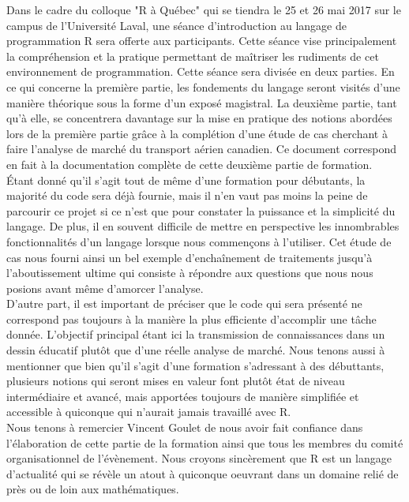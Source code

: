 Dans le cadre du colloque "R à Québec" qui se tiendra le 25 et 26 mai 2017 sur le campus de l'Université Laval, une séance d'introduction au langage de programmation R sera offerte aux participants. Cette séance vise principalement la compréhension et la pratique permettant de maîtriser les rudiments de cet environnement de programmation. \cite{RQC2017} Cette séance sera divisée en deux parties. En ce qui concerne la première partie, les fondements du langage seront visités d'une manière théorique sous la forme d'un exposé magistral. La deuxième partie, tant qu'à elle, se concentrera davantage sur la mise en pratique des notions abordées lors de la première partie grâce à la complétion d'une étude de cas cherchant à faire l'analyse de marché du transport aérien canadien. Ce document correspond en fait à la documentation complète de cette deuxième partie de formation. \\

\noindent
Étant donné qu'il s'agit tout de même d'une formation pour débutants, la majorité du code sera déjà fournie, mais il n'en vaut pas moins la peine de parcourir ce projet si ce n'est que pour constater la puissance et la simplicité du langage. De plus, il en souvent difficile de mettre en perspective les innombrables fonctionnalités d'un langage lorsque nous commençons à l'utiliser. Cet étude de cas nous fourni ainsi un bel exemple d'enchaînement de traitements jusqu'à l'aboutissement ultime qui consiste à répondre aux questions que nous nous posions avant même d'amorcer l'analyse. \\

\noindent
D'autre part, il est important de préciser que le code qui sera présenté ne correspond pas toujours à la manière la plus efficiente d'accomplir une tâche donnée. L'objectif principal étant ici la transmission de connaissances dans un dessin éducatif plutôt que d'une réelle analyse de marché. Nous tenons aussi à mentionner que bien qu'il s'agit d'une formation s'adressant à des débuttants, plusieurs notions qui seront mises en valeur font plutôt état de niveau intermédiaire et avancé, mais apportées toujours de manière simplifiée et accessible à quiconque qui n'aurait jamais travaillé avec R. \\

\noindent
Nous tenons à remercier Vincent Goulet de nous avoir fait confiance dans l'élaboration de cette partie de la formation ainsi que tous les membres du comité organisationnel de l'évènement. Nous croyons sincèrement que R est un langage d'actualité qui se révèle un atout à quiconque oeuvrant dans un domaine relié de près ou de loin aux mathématiques.